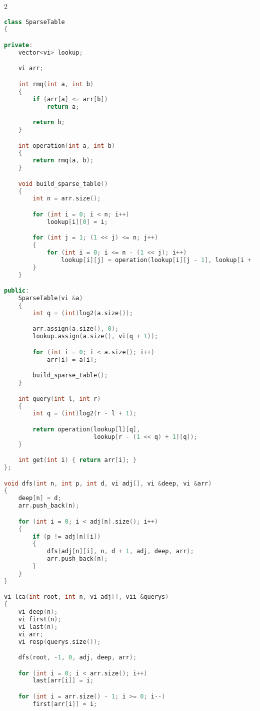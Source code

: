 \documentclass[leter]{amsart}
\begin{document}
\begin{multicols}{2}
\begin{lstlisting}[language=C++]
class SparseTable
{

private:
    vector<vi> lookup;

    vi arr;

    int rmq(int a, int b)
    {
        if (arr[a] <= arr[b])
            return a;

        return b;
    }

    int operation(int a, int b)
    {
        return rmq(a, b);
    }

    void build_sparse_table()
    {
        int n = arr.size();

        for (int i = 0; i < n; i++)
            lookup[i][0] = i;

        for (int j = 1; (1 << j) <= n; j++)
        {
            for (int i = 0; i <= n - (1 << j); i++)
                lookup[i][j] = operation(lookup[i][j - 1], lookup[i + (1 << (j - 1))][j - 1]);
        }
    }

public:
    SparseTable(vi &a)
    {
        int q = (int)log2(a.size());

        arr.assign(a.size(), 0);
        lookup.assign(a.size(), vi(q + 1));

        for (int i = 0; i < a.size(); i++)
            arr[i] = a[i];

        build_sparse_table();
    }

    int query(int l, int r)
    {
        int q = (int)log2(r - l + 1);

        return operation(lookup[l][q],
                         lookup[r - (1 << q) + 1][q]);
    }

    int get(int i) { return arr[i]; }
};

void dfs(int n, int p, int d, vi adj[], vi &deep, vi &arr)
{
    deep[n] = d;
    arr.push_back(n);

    for (int i = 0; i < adj[n].size(); i++)
    {
        if (p != adj[n][i])
        {
            dfs(adj[n][i], n, d + 1, adj, deep, arr);
            arr.push_back(n);
        }
    }
}

vi lca(int root, int n, vi adj[], vii &querys)
{
    vi deep(n);
    vi first(n);
    vi last(n);
    vi arr;
    vi resp(querys.size());

    dfs(root, -1, 0, adj, deep, arr);

    for (int i = 0; i < arr.size(); i++)
        last[arr[i]] = i;

    for (int i = arr.size() - 1; i >= 0; i--)
        first[arr[i]] = i;


\end{lstlisting}
\end{multicols}
\end{document}
